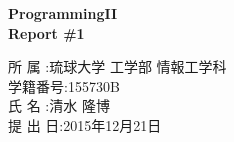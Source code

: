 \documentclass[12pt]{jarticle} %
\begin{document}
\begin{titlepage}
    \begin{center} %
        \fontsize{25pt}{0pt}\selectfont %
        \vspace*{100truept}
        \bf{ProgrammingII}\\ %
        \vspace*{10truept}
        \bf{Report  \#1}\\ %
        \vspace{340truept}
    \end{center}
    \begin{flushright}
        {\large
            \fontsize{16pt}{0pt}\selectfont
          所  属  :琉球大学 工学部 情報工学科\\
            \vspace{5truept}
          学籍番号:155730B\\
            \vspace{5truept}
          氏  名  :清水 隆博\\
            \vspace{5truept}
          提 出 日:2015年12月21日\\
            \vspace{5truept}
        }    
    \end{flushright}
\end{titlepage}

\tableofcontents %
\pagestyle{plain}

\newpage
\end{document}

